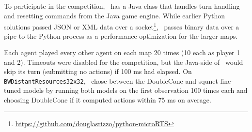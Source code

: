 \documentclass[conference]{IEEEtran}
\begin{document}
To participate in the competition, \agentName\ has a Java class that handles turn
handling and resetting commands from the Java game engine. While earlier Python
solutions  passed JSON or XML data over a
socket\footnote{\url{https://github.com/douglasrizzo/python-microRTS}}, \agentName\
passes binary data over a pipe to the Python process as a performance optimization for
the larger maps.

Each agent played every other agent on each map 20 times (10 each as player 1 and 2).
Timeouts were disabled for the competition, but the Java-side of \agentName\ would skip
its turn (submitting no actions) if 100 ms had elapsed. On
\texttt{BWDistantResources32x32}, \agentName\ chose between the DoubleCone and squnet
fine-tuned models by running both models on the first observation 100 times each and
choosing DoubleCone if it computed actions within 75 ms on average.
\end{document}
